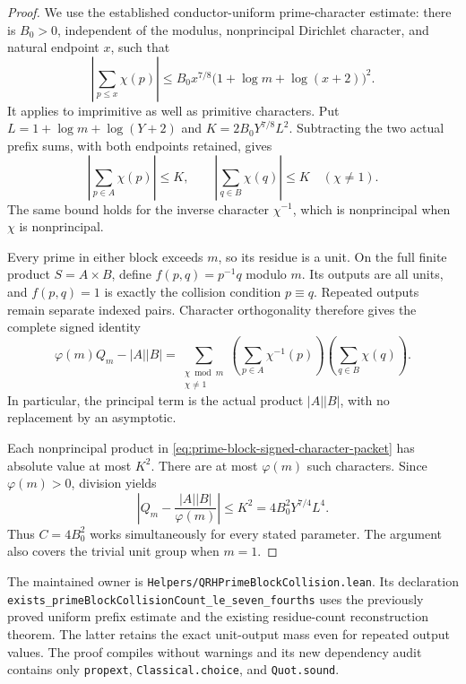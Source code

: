 \documentclass[11pt]{article}
\begin{document}
\begin{proof}
We use the established conductor-uniform prime-character estimate:
there is \(B_0>0\), independent of the modulus, nonprincipal
Dirichlet character, and natural endpoint \(x\), such that
\[
 \left|\sum_{p\le x}\chi(p)\right|
 \le B_0x^{7/8}
       \bigl(1+\log m+\log(x+2)\bigr)^2.
\]
It applies to imprimitive as well as primitive characters.
Put \(L=1+\log m+\log(Y+2)\) and
\(K=2B_0Y^{7/8}L^2\). Subtracting the two actual prefix sums,
with both endpoints retained, gives
\[
 \left|\sum_{p\in A}\chi(p)\right|\le K,\qquad
 \left|\sum_{q\in B}\chi(q)\right|\le K
 \quad(\chi\ne1).
\]
The same bound holds for the inverse character \(\chi^{-1}\),
which is nonprincipal when \(\chi\) is nonprincipal.

Every prime in either block exceeds \(m\), so its residue is a
unit. On the full finite product \(S=A\times B\), define
\(f(p,q)=p^{-1}q\) modulo \(m\). Its outputs are all units, and
\(f(p,q)=1\) is exactly the collision condition \(p\equiv q\).
Repeated outputs remain separate indexed pairs. Character
orthogonality therefore gives the complete signed identity
\begin{equation}
 \varphi(m)Q_m-|A||B|
 =\sum_{\substack{\chi\bmod m\\\chi\ne1}}
       \left(\sum_{p\in A}\chi^{-1}(p)\right)
       \left(\sum_{q\in B}\chi(q)\right).
 \label{eq:prime-block-signed-character-packet}
\end{equation}
In particular, the principal term is the actual product
\(|A||B|\), with no replacement by an asymptotic.

Each nonprincipal product in
\eqref{eq:prime-block-signed-character-packet} has absolute value
at most \(K^2\). There are at most \(\varphi(m)\) such characters.
Since \(\varphi(m)>0\), division yields
\[
 \left|Q_m-\frac{|A||B|}{\varphi(m)}\right|
       \le K^2=4B_0^2Y^{7/4}L^4.
\]
Thus \(C=4B_0^2\) works simultaneously for every stated parameter.
The argument also covers the trivial unit group when \(m=1\).
\end{proof}

The maintained owner is
\texttt{Helpers/QRHPrimeBlockCollision.\allowbreak lean}.
Its declaration
\texttt{exists\_primeBlockCollisionCount\_le\_seven\_fourths}
uses the previously proved uniform prefix estimate and the
existing residue-count reconstruction theorem. The latter retains
the exact unit-output mass even for repeated output values.
The proof compiles without warnings and its new dependency audit
contains only \texttt{propext}, \texttt{Classical.choice}, and
\texttt{Quot.sound}.
\end{document}
